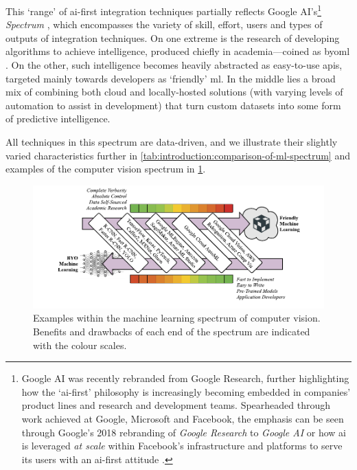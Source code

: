 


This `range' of \gls{ai}-first integration techniques partially reflects Google AI's\footnote{
Google AI was recently rebranded from Google Research, further highlighting how the `\gls{ai}-first' philosophy is increasingly becoming embedded in companies' product lines and research and development teams. Spearheaded through work achieved at Google, Microsoft and Facebook, the emphasis can be seen through Google's 2018 rebranding of \textit{Google Research} to \textit{Google AI}  or how \gls{ai} is leveraged \textit{at scale} within Facebook's infrastructure and platforms to serve its users with an \gls{ai}-first attitude \citep{Parekh:2017hx}.
} 
\textit{ Spectrum} \citep{Ortiz:2017wg,LaForge:2018tm,McGowen:2019vt}, which encompasses the variety of skill, effort, users and types of outputs of integration techniques. On one extreme is the research of developing algorithms to achieve intelligence, produced chiefly in academia---coined as \gls{byoml} \citep{Ortiz:2017wg,McGowen:2019vt,Jimerson:2017vh}. On the other, such intelligence becomes heavily abstracted as easy-to-use \glspl{api}, targeted mainly towards developers as `friendly' \gls{ml}. In the middle lies a broad mix of combining both cloud and locally-hosted solutions (with varying levels of automation to assist in development) that turn custom datasets into some form of predictive intelligence. 

All techniques in this spectrum are data-driven, and we illustrate their slightly varied characteristics further in \cref{tab:introduction:comparison-of-ml-spectrum} and examples of the computer vision spectrum in \cref{fig:introduction:cv-spectrum}.

\begin{figure}[h!]
\centering
\caption[The spectrum of machine learning]{Examples within the machine learning spectrum of computer vision. Benefits and drawbacks of each end of the spectrum are indicated with the colour scales.}
\label{fig:introduction:cv-spectrum}
\includegraphics[width=\linewidth]{cv-spectrum}
\end{figure}

